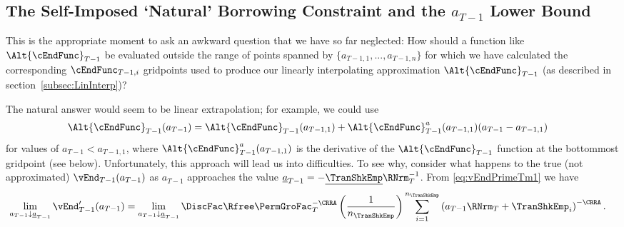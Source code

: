 \documentclass[titlepage, headings=optiontotocandhead]{\econtex}
\begin{document}
\hypertarget{The-Self-Imposed-Natural-Borrowing-Constraint-and-the-a-Lower-Bound}{}
\subsection{The Self-Imposed `Natural' Borrowing Constraint and the $a_{T-1}$ Lower Bound} \label{subsec:LiqConstrSelfImposed}


This is the appropriate moment to ask an awkward question that we have so far
neglected: How should a function like $\Alt{\cEndFunc}_{T-1}$
be evaluated outside the range of points spanned by
$\{{a}_{T-1,1},...,{a}_{T-1,n}\}$ for which we have calculated
the corresponding $\cEndFunc_{T-1,i}$ gridpoints used to produce our
linearly interpolating approximation $\Alt{\cEndFunc}_{T-1}$ (as described in section~\ref{subsec:LinInterp})?

The natural answer would seem to be linear extrapolation; for example, we could use
\begin{equation}\begin{gathered}\begin{aligned}
      \Alt{\cEndFunc}_{T-1}({a}_{T-1})  & = \Alt{\cEndFunc}_{T-1}({a}_{T-1,1})+\Alt{\cEndFunc}_{T-1}^{{a}}({a}_{T-1,1})({a}_{T-1}-{a}_{T-1,1}) \label{eq:ExtrapLin}
    \end{aligned}\end{gathered}\end{equation}
for values of ${a}_{T-1} < {a}_{T-1,1}$, where $\Alt{\cEndFunc}_{T-1}^{{a}}({a}_{T-1,1})$ is the derivative of the $\Alt{\cEndFunc}_{T-1}$ function at the bottommost gridpoint (see below).  Unfortunately, this approach
will lead us into difficulties.  To see why, consider what
happens to the true (not approximated) $\vEnd_{T-1}({a}_{T-1})$ as
${a}_{T-1}$ approaches the value
$\underline{a}_{T-1}=-\underline{\TranShkEmp}\RNrm_{T}^{-1}$.  From
\eqref{eq:vEndPrimeTm1} we have
\begin{equation}\begin{gathered}\begin{aligned}
      \lim_{{a}_{T-1} \downarrow \underline{a}_{T-1}} \vEnd_{T-1}^{\prime}({a}_{T-1}) 
      & =                                                                                         \lim_{{a}_{T-1} \downarrow \underline{a}_{T-1}} \DiscFac \Rfree \PermGroFac_{T}^{-\CRRA} \left(\frac{1}{n_{\TranShkEmp}}\right) \sum_{i=1}^{n_{\TranShkEmp}} \left( {a}_{T-1} \RNrm_{T}+ \TranShkEmp_{i}\right)^{-\CRRA}.
    \end{aligned}\end{gathered}\end{equation}
\end{document}
